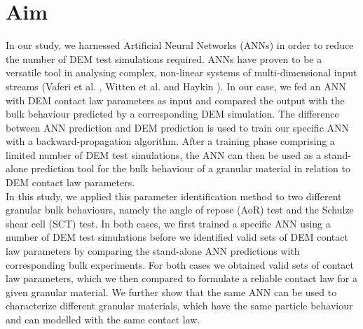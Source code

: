 
\chapter{Aim}
\label{cap:aim}

In our study, we harnessed Artificial Neural Networks (\acs{ANNs}) in order to
reduce the number of \acs{DEM} test simulations required. 
\acs{ANNs} have proven to be a versatile tool in analysing complex, non-linear
systems of multi-dimensional input streams (Vaferi et al. \cite{RefWorks:150}, Witten et
al. \cite{RefWorks:174} and Haykin \cite{RefWorks:158}).
In our case, we fed an \acs{ANN} with \acs{DEM} contact law parameters as input
and compared the output with the bulk behaviour 
predicted by a corresponding \acs{DEM} simulation. 
The difference between \acs{ANN} prediction and \acs{DEM} prediction is used to train our 
specific \acs{ANN} with a backward-propagation algorithm. 
After a training phase comprising a limited number of \acs{DEM} test simulations,
the \acs{ANN} can then be used as a stand-alone prediction tool for the bulk behaviour of a 
granular material in relation to \acs{DEM} contact law parameters. \\
In this study, we applied this parameter identification method to two different
granular bulk behaviours, namely the angle of repose (\acs{AoR}) test and the
Schulze shear cell (\acs{SCT}) test.
In both cases, we first trained a specific \acs{ANN} using a number of \acs{DEM} test
simulations before we identified valid sets of \acs{DEM} contact law parameters by
comparing the stand-alone \acs{ANN} predictions with corresponding bulk experiments. 
For both cases we obtained valid sets of contact law parameters, 
which we then compared to formulate a reliable contact law for a given
granular material.
We further show that the same \acs{ANN} can be used to characterize different granular materials, 
which have the same particle behaviour and can modelled with the same contact
law.

